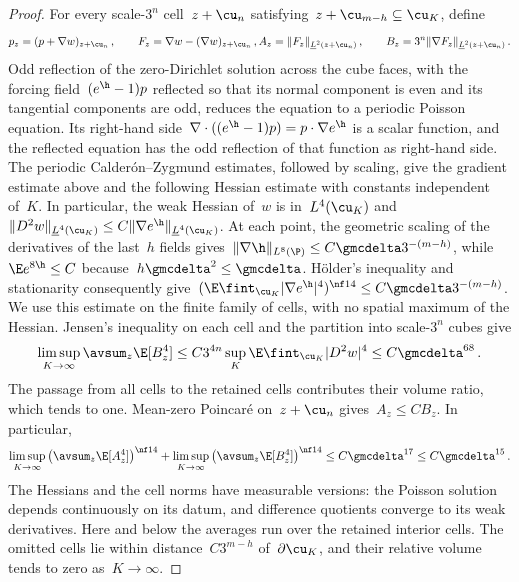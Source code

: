 \documentclass[11pt]{amsart}
\begin{document}
\begin{proof}
	For every scale-$3^n$ cell~$z+\cu_n$ satisfying~$z+\cu_{m-h}\subseteq\cu_K$, define
	\begin{equation*}
		p_z=(p+\nabla w)_{z+\cu_n}\,,
		\qquad
		F_z=\nabla w-(\nabla w)_{z+\cu_n}\,,
		A_z=\|F_z\|_{\underline L^2(z+\cu_n)}\,,
		\qquad
		B_z=3^n\|\nabla F_z\|_{\underline L^2(z+\cu_n)}\,.
	\end{equation*}
    Odd reflection of the zero-Dirichlet solution across the cube faces, with the forcing field~$(e^\h-1)p$ reflected so that its normal component is even and its tangential components are odd, reduces the equation to a periodic Poisson equation. Its right-hand side~$\nabla\cdot((e^\h-1)p)=p\cdot\nabla e^\h$ is a scalar function, and the reflected equation has the odd reflection of that function as right-hand side. The periodic Calder\'on--Zygmund estimates, followed by scaling, give the gradient estimate above and the following Hessian estimate with constants independent of~$K$. In particular, the weak Hessian of~$w$ is in~$L^4(\cu_K)$ and~$\|D^2w\|_{\underline L^4(\cu_K)}\leq C\|\nabla e^\h\|_{\underline L^4(\cu_K)}$. At each point, the geometric scaling of the derivatives of the last~$h$ fields gives~$\|\nabla\h\|_{L^8(\P)}\leq C\gmcdelta3^{-(m-h)}$, while~$\E e^{8\h}\leq C$ because~$h\gmcdelta^2\leq\gmcdelta$. H\"older's inequality and stationarity consequently give~$(\E\fint_{\cu_K}|\nabla e^\h|^4)^{\nf14}\leq C\gmcdelta3^{-(m-h)}$. We use this estimate on the finite family of cells, with no spatial maximum of the Hessian. Jensen's inequality on each cell and the partition into scale-$3^n$ cubes give
\begin{equation*}
	\limsup_{K\to\infty}\avsum_z\E[B_z^4]
	\leq C3^{4n}\sup_K\E\fint_{\cu_K}|D^2w|^4
	\leq C\gmcdelta^{68}\,.
\end{equation*}
The passage from all cells to the retained cells contributes their volume ratio, which tends to one. Mean-zero Poincar\'e on~$z+\cu_n$ gives~$A_z\leq CB_z$. In particular,
\begin{equation*}
	\limsup_{K\to\infty}\left(\avsum_z\E[A_z^4]\right)^{\nf14}
	+\limsup_{K\to\infty}\left(\avsum_z\E[B_z^4]\right)^{\nf14}
	\leq C\gmcdelta^{17}\leq C\gmcdelta^{15}\,.
\end{equation*}
The Hessians and the cell norms have measurable versions: the Poisson solution depends continuously on its datum, and difference quotients converge to its weak derivatives. Here and below the averages run over the retained interior cells. The omitted cells lie within distance~$C3^{m-h}$ of~$\partial\cu_K$, and their relative volume tends to zero as~$K\to\infty$.


\end{proof}
\end{document}
